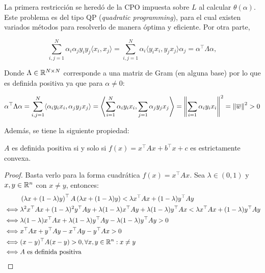 La primera restricción se heredó de la CPO impuesta sobre $L$ al calcular $\theta(\alpha)$. Este problema es del tipo QP (\emph{quadratic programming}), para el cual existen variados métodos para resolverlo de manera óptima y eficiente. Por otra parte,

\begin{equation}
\sum\limits_{i,j=1}^{N} \alpha_i \alpha_j y_i y_j \langle x_i, x_j\rangle = \sum\limits_{i,j=1}^{N}  \alpha_i \langle   y_i x_i,  y_jx_j\rangle \alpha_j = \alpha^\top \Lambda \alpha,
\end{equation}
 
Donde $\Lambda\in\mathbb{R}^{N\times N}$ corresponde a una matriz de Gram (en alguna base) por lo que es definida positiva ya que para $\alpha\neq 0$:

\begin{equation}
    \alpha^\top \Lambda \alpha = \sum\limits_{i,j=1}^{N}   \langle   \alpha_i y_i x_i,  \alpha_j y_jx_j\rangle = \left\langle\sum\limits_{i=1}^{N}      \alpha_i y_i x_i,  \sum\limits_{j=1} \alpha_j y_jx_j\right\rangle = \left\lVert\sum\limits_{i=1} \alpha_i y_i x_i\right\rVert^2 = \left\lVert\overline{w}\right\rVert^2>0 
\end{equation}

Además, se tiene la siguiente propiedad:

\begin{lemma}
    $A$ es definida positiva si y solo si $f(x)= x^\top Ax + b^\top x + c$ es estrictamente convexa.
\end{lemma}

\begin{proof}
    Basta verlo para la forma cuadrática $f(x)=x^\top Ax$. Sea $\lambda\in (0,1)$ y $x,y\in\mathbb{R}^n$ con $x\neq y$, entonces:
\begin{align*}
    &\left(\lambda x+(1-\lambda)y\right)^\top A \left(\lambda x+(1-\lambda)y\right) <\lambda x^\top Ax + (1-\lambda)y^\top Ay\\
            \iff &\lambda^2 x^\top Ax + (1-\lambda)^2 y^\top Ay + \lambda(1-\lambda)x^\top Ay + \lambda(1-\lambda)y^\top Ax < \lambda x^\top Ax+(1-\lambda)y^\top Ay\\
            \iff & \lambda(1-\lambda)x^\top Ax+\lambda(1-\lambda)y^\top Ay-\lambda(1-\lambda)y^\top Ay> 0\\
            \iff & x^\top Ax+y^\top Ay-x^\top Ay-y^\top Ax> 0\\
            \iff & (x-y)^\top A(x-y)> 0, \forall x,y\in \mathbb{R}^n:x\neq y\\
            \iff &A \text{ es definida positiva}
\end{align*}
\end{proof}

